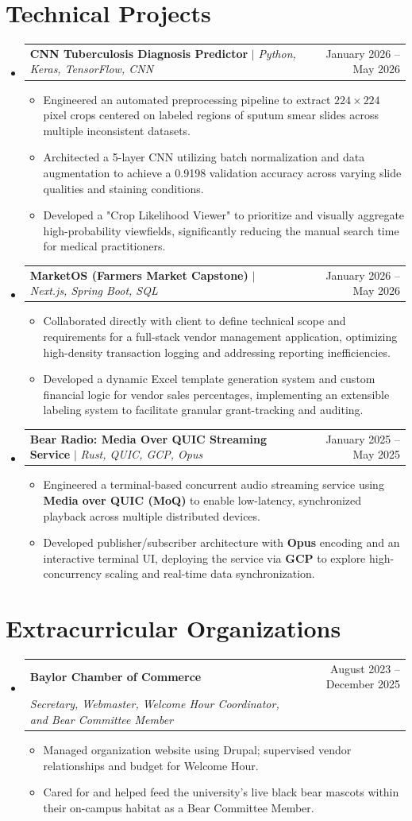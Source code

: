 \documentclass[letterpaper,11pt]{article}
\makeatletter
\newcommand{\resumeItem}[1]{
  \item\small{
    {#1 \vspace{-2pt}}
  }
}
\newcommand{\resumeSubheading}[4]{
  \vspace{-1pt}\item
    \begin{tabular*}{0.97\textwidth}[t]{l@{\extracolsep{\fill}}r}
      \textbf{#1} & #2 \\
      \textit{\small#3} & \textit{\small #4} \\
    \end{tabular*}\vspace{-7pt}
}
\newcommand{\resumeProjectHeading}[2]{
    \vspace{-1pt}\item
    \begin{tabular*}{0.97\textwidth}{l@{\extracolsep{\fill}}r}
      \small#1 & #2 \\
    \end{tabular*}\vspace{-7pt}
}
\newcommand{\resumeSubHeadingListStart}{\begin{itemize}[leftmargin=0.15in, label={}]}
\newcommand{\resumeSubHeadingListEnd}{\end{itemize}}
\newcommand{\resumeItemListStart}{\begin{itemize}[leftmargin=0.2in]}
\newcommand{\resumeItemListEnd}{\end{itemize}\vspace{-5pt}}
\makeatother
\begin{document}
\newpage

\section{Technical Projects}
    \resumeSubHeadingListStart
      \resumeProjectHeading
          {\textbf{CNN Tuberculosis Diagnosis Predictor} $|$ \emph{Python, Keras, TensorFlow, CNN}}{January 2026 -- May 2026}
          \resumeItemListStart
            \resumeItem{Engineered an automated preprocessing pipeline to extract $224 \times 224$ pixel crops centered on labeled regions of sputum smear slides across multiple inconsistent datasets.}
            \resumeItem{Architected a 5-layer CNN utilizing batch normalization and data augmentation to achieve a 0.9198 validation accuracy across varying slide qualities and staining conditions.}
            \resumeItem{Developed a "Crop Likelihood Viewer" to prioritize and visually aggregate high-probability viewfields, significantly reducing the manual search time for medical practitioners.}
          \resumeItemListEnd
      \resumeProjectHeading
          {\textbf{MarketOS (Farmers Market Capstone)} $|$ \emph{Next.js, Spring Boot, SQL}}{January 2026 -- May 2026}
          \resumeItemListStart
            \resumeItem{Collaborated directly with client to define technical scope and requirements for a full-stack vendor management application, optimizing high-density transaction logging and addressing reporting inefficiencies.}
            \resumeItem{Developed a dynamic Excel template generation system and custom financial logic for vendor sales percentages, implementing an extensible labeling system to facilitate granular grant-tracking and auditing.}
          \resumeItemListEnd
      \resumeProjectHeading
          {\textbf{Bear Radio: Media Over QUIC Streaming Service} $|$ \emph{Rust, QUIC, GCP, Opus}}{January 2025 -- May 2025}
          \resumeItemListStart
            \resumeItem{Engineered a terminal-based concurrent audio streaming service using \textbf{Media over QUIC (MoQ)} to enable low-latency, synchronized playback across multiple distributed devices.}
            \resumeItem{Developed publisher/subscriber architecture with \textbf{Opus} encoding and an interactive terminal UI, deploying the service via \textbf{GCP} to explore high-concurrency scaling and real-time data synchronization.}
          \resumeItemListEnd
    \resumeSubHeadingListEnd

\section{Extracurricular Organizations}
    \resumeSubHeadingListStart
      \resumeSubheading
        {Baylor Chamber of Commerce}{August 2023 -- December 2025}
        {Secretary, Webmaster, Welcome Hour Coordinator, and Bear Committee Member}{}
        \resumeItemListStart
          \resumeItem{Managed organization website using Drupal; supervised vendor relationships and budget for Welcome Hour.}
          \resumeItem{Cared for and helped feed the university's live black bear mascots within their on-campus habitat as a Bear Committee Member.}
        \resumeItemListEnd
  \resumeSubHeadingListEnd

\end{document}
